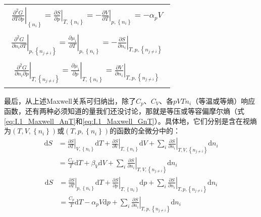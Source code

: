 \documentclass[main.tex]{subfiles}
\begin{document}
\begin{longtable}{m{}}
  \begin{align}
    \left.\frac{\partial^2 G}{\partial T\partial p}\right|_{\left\{n_i\right\}}              =\left.\frac{\partial S}{\partial p}\right|_{T,\left\{n_i\right\}}=-\left.\frac{\partial V}{\partial T}\right|_{p,\left\{n_i\right\}}=-\alpha_p V\label{eq:I.1_Maxwell_GTp}\end{align}                  \\[-8ex]
  \begin{align}\left.\frac{\partial ^2G}{\partial n_i\partial T}\right|_{p,\left\{n_{j\neq i}\right\}}  =\left.\frac{\partial \mu_i}{\partial T}\right|_{p,\left\{n_i\right\}}=-\left.\frac{\partial S}{\partial n_i}\right|_{T,p,\left\{n_{j\neq i}\right\}}\label{eq:I.1_Maxwell_GnT}\end{align} \\[-8ex]
  \begin{align}\left.\frac{\partial ^2G}{\partial n_i\partial p}\right|_{T,\left\{n_{j\neq i}\right\}}  =\left.\frac{\partial \mu_i}{\partial p}\right|_{T,\left\{n_i\right\}}=\left.\frac{\partial V}{\partial n_i}\right|_{T,p,\left\{n_{j\neq i}\right\}}\label{eq:I.1_Maxwell_GnV}\end{align}  \\
  \hline
\end{longtable}
最后，从上述Maxwell关系可归纳出，除了$C_p$、$C_V$、各$pVTn_i$（等温或等熵）响应函数，还有两种必须知道的量我们还没讨论，那就是等压或等容偏摩尔熵（式\eqref{eq:I.1_Maxwell_AnT}和\eqref{eq:I.1_Maxwell_GnT}）。具体地，它们分别是含在视熵为$\left(T,V,\left\{n_i\right\}\right)$或$\left(T,p,\left\{n_i\right\}\right)$的函数的全微分中的：
\begin{equation}
  \begin{aligned}
    \mathrm{d}S & =\left.\frac{\partial S}{\partial T}\right|_{V,\left\{n_i\right\}}\mathrm{d}T+\left.\frac{\partial S}{\partial V}\right|_{T,\left\{n_i\right\}}\mathrm{d}V+\sum_i\left.\frac{\partial S}{\partial n_i}\right|_{T,V,\left\{n_{j\neq i}\right\}}\mathrm{d}n_i \\
                & =\frac{C_V}{T}\mathrm{d}T+\beta_V\mathrm{d}V+\sum_i\left.\frac{\partial S}{\partial n_i}\right|_{T,V,\left\{n_{j\neq i}\right\}}\mathrm{d}n_i \label{eq:I.1_dS_T_V}
  \end{aligned}
\end{equation}
\begin{equation}
  \begin{aligned}
    \mathrm{d}S & =\left.\frac{\partial S}{\partial T}\right|_{p,\left\{n_i\right\}}\mathrm{d}T+\left.\frac{\partial S}{\partial p}\right|_{T,\left\{n_i\right\}}\mathrm{d}p+\sum_i\left.\frac{\partial S}{\partial n_i}\right|_{T,p,\left\{n_{j\neq i}\right\}}\mathrm{d}n_i \\
                & =\frac{C_p}{T}\mathrm{d}T-\alpha_pV\mathrm{d}p+\sum_i\left.\frac{\partial S}{\partial n_i}\right|_{T,p,\left\{n_{j\neq i}\right\}}\mathrm{d}n_i\label{eq:I.1_dS_T_p}
  \end{aligned}
\end{equation}
\end{document}
